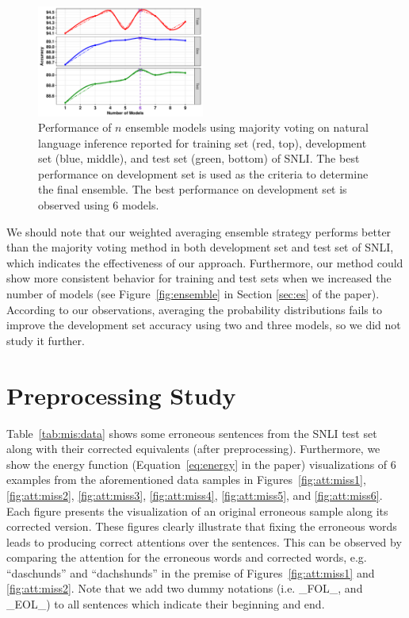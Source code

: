 \documentclass[11pt,a4paper]{article}
\begin{document}
	\begin{figure}[t]
		\centering
		\includegraphics[width=0.49\textwidth ]{ens_mj.pdf}
		\caption{Performance of $n$ ensemble models using majority voting on natural language inference reported for training set (red, top), development set (blue, middle), and test set (green, bottom) of SNLI. The best performance on development set is used as the criteria to determine the final ensemble. The best performance on development set is observed using 6 models. \label{fig:mj:ensemble}}
	\end{figure}
	
	We should note that our weighted averaging ensemble strategy performs better than the majority voting method in both development set and test set of SNLI, which indicates the effectiveness of our approach. Furthermore, our method could show more consistent behavior for training and test sets when we increased the number of models (see Figure~\ref{fig:ensemble} in Section \ref{sec:es} of the paper). According to our observations, averaging the probability distributions fails to improve the development set accuracy using two and three models, so we did not study it further.
	
	\section{Preprocessing Study}
	\label{app:preproc:sec}
	
	\noindent Table~\ref{tab:mis:data} shows some erroneous sentences from the SNLI test set along with their corrected equivalents (after preprocessing). Furthermore, we show the energy function (Equation~\ref{eq:energy} in the paper) visualizations of 6 examples from the aforementioned data samples in Figures~\ref{fig:att:miss1}, \ref{fig:att:miss2}, \ref{fig:att:miss3}, \ref{fig:att:miss4}, \ref{fig:att:miss5}, and \ref{fig:att:miss6}. Each figure presents the visualization of an original erroneous sample along its corrected version. These figures clearly illustrate that fixing the erroneous words leads to producing correct attentions over the sentences. This can be observed by comparing the attention for the erroneous words and corrected words, e.g. ``daschunds'' and ``dachshunds'' in the premise of Figures~\ref{fig:att:miss1} and \ref{fig:att:miss2}. Note that we add two dummy notations (i.e. \_FOL\_, and \_EOL\_) to all sentences which indicate their beginning and end. 
	
\end{document}
